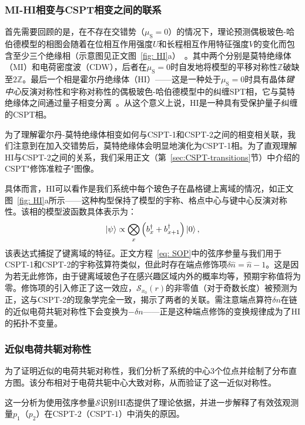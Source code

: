 \documentclass[preprint,superscriptaddress,floatfix,nofootinbib]{revtex4-2}
\begin{document}
\subsubsection*{MI-HI相变与CSPT相变之间的联系}

首先需要回顾的是，在不存在交错势（$\mu_{\text{S}} = 0$）的情况下，理论预测偶极玻色-哈伯德模型的相图会随着在位相互作用强度$U$和长程相互作用特征强度$V$的变化而包含至少三个绝缘相（示意图见正文图~\ref{fig: HI}a）~\cite{Torre2006, Berg2008}。其中两个分别是莫特绝缘体（MI）和电荷密度波（CDW），后者在$\mu_{\text{S}} = 0$时自发地将模型的平移对称性$\mathbb{Z}$破缺至$2\mathbb{Z}$。最后一个相是霍尔丹绝缘体（HI）——这是一种处于$\mu_{\text{S}} = 0$时具有晶体\textit{键中心}反演对称性和宇称对称性的偶极玻色-哈伯德模型中的纠缠SPT相，它与莫特绝缘体之间通过量子相变分离~\cite{Pollmann2010}。从这个意义上说，HI是一种具有受保护量子纠缠的CSPT相。

为了理解霍尔丹-莫特绝缘体相变如何与CSPT-1和CSPT-2之间的相变相关联\cite{Sahay2025}，我们注意到在加入交错势后，莫特绝缘体会明显地演化为CSPT-1相。为了直观理解HI与CSPT-2之间的关系，我们采用正文（第~\ref{sec:CSPT-transitions}节）中介绍的CSPT"修饰准粒子"图像。

具体而言，HI可以看作是我们系统中每个玻色子在晶格键上离域的情况，如正文图~\ref{fig: HI}a所示——这种构型保持了模型的宇称、格点中心与键中心反演对称性。该相的模型波函数具体表示为：
\begin{equation} \label{eq:model-wavefunction}
    \ket{\psi} \propto \bigotimes_{x} \left( b_{x}^{\dagger} + b_{x + 1}^{\dagger} \right) \ket{0},
\end{equation}
该表达式捕捉了键离域的特征。正文方程~\eqref{eq: SOP}中的弦序参量与我们用于CSPT-1和CSPT-2的宇称弦算符类似，但此时存在端点修饰项$\delta \hat n = \hat n-1$。这是因为若无此修饰，由于键离域玻色子在感兴趣区域内外的概率均等，预期宇称值将为零。修饰项的引入修正了这一效应，$\mathcal{S}_{x_0} (r)$的非零值（对于奇数长度）被预测为正，这与CSPT-2的现象学完全一致，揭示了两者的关联。需注意端点算符$\delta n$在链的近似电荷共轭对称性下会变换为$-\delta n$——正是这种端点修饰的变换规律成为了HI的拓扑不变量\cite{Pollmann2012, Schuch2011, Chen2011}。
\subsubsection*{近似电荷共轭对称性}
为了证明近似的电荷共轭对称性，我们分析了系统的中心3个位点并绘制了分布直方图。该分布相对于电荷共轭中心大致对称，从而验证了这一近似对称性。

这一分析为使用弦序参量$\mathcal{S}$识别HI态提供了理论依据，并进一步解释了有效弦观测量$p_1$（$p_2$）在CSPT-$2$（CSPT-$1$）中消失的原因。
\end{document}
